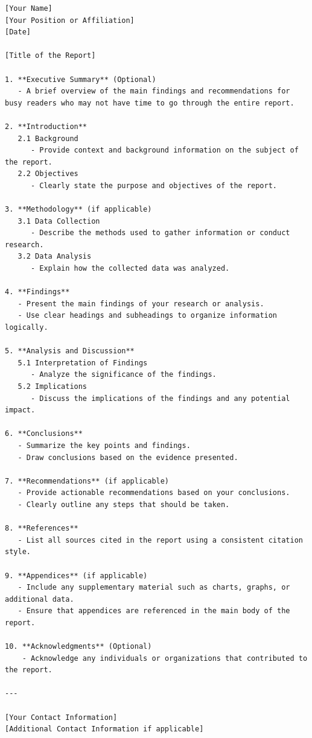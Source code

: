 \documentclass{report}
\begin{document}
\begin{verbatim}
[Your Name]
[Your Position or Affiliation]
[Date]

[Title of the Report]

1. **Executive Summary** (Optional)
   - A brief overview of the main findings and recommendations for busy readers who may not have time to go through the entire report.

2. **Introduction**
   2.1 Background
      - Provide context and background information on the subject of the report.
   2.2 Objectives
      - Clearly state the purpose and objectives of the report.

3. **Methodology** (if applicable)
   3.1 Data Collection
      - Describe the methods used to gather information or conduct research.
   3.2 Data Analysis
      - Explain how the collected data was analyzed.

4. **Findings**
   - Present the main findings of your research or analysis.
   - Use clear headings and subheadings to organize information logically.

5. **Analysis and Discussion**
   5.1 Interpretation of Findings
      - Analyze the significance of the findings.
   5.2 Implications
      - Discuss the implications of the findings and any potential impact.

6. **Conclusions**
   - Summarize the key points and findings.
   - Draw conclusions based on the evidence presented.

7. **Recommendations** (if applicable)
   - Provide actionable recommendations based on your conclusions.
   - Clearly outline any steps that should be taken.

8. **References**
   - List all sources cited in the report using a consistent citation style.

9. **Appendices** (if applicable)
   - Include any supplementary material such as charts, graphs, or additional data.
   - Ensure that appendices are referenced in the main body of the report.

10. **Acknowledgments** (Optional)
    - Acknowledge any individuals or organizations that contributed to the report.

---

[Your Contact Information]
[Additional Contact Information if applicable]
\end{verbatim}
\\
\sol{}

\end{document}
